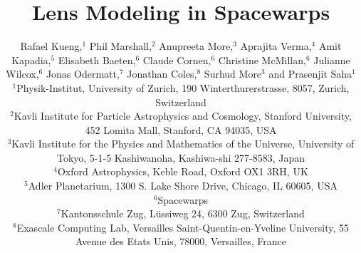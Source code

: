 \documentclass[usenatbib]{mn2e}
\newcommand{\sw}{Spacewarps\xspace}
\begin{document}
\title{Lens Modeling in \sw}

\author[Kueng et al]{Rafael Kueng,$^{1}$
Phil Marshall,$^{2}$
Anupreeta More,$^{3}$
Aprajita Verma,$^{4}$
Amit Kapadia,$^{5}$
\newauthor
Elisabeth Baeten,$^{6}$
Claude Cornen,$^{6}$
Christine McMillan,$^{6}$
Julianne Wilcox,$^{6}$
\newauthor
Jonas Odermatt,$^{7}$
Jonathan Coles,$^{8}$
Surhud More$^{3}$
and Prasenjit Saha$^{1}$ \\
$^{1}$Physik-Institut, University of Zurich, 190 Winterthurerstrasse, 8057, Zurich, Switzerland\\
$^{2}$Kavli Institute for Particle Astrophysics and Cosmology, Stanford University, 452 Lomita Mall, Stanford, CA 94035, USA\\
$^{3}$Kavli Institute for the Physics and Mathematics of the Universe, University of Tokyo, 5-1-5 Kashiwanoha, Kashiwa-shi 277-8583, Japan\\
$^{4}$Oxford Astrophysics, Keble Road, Oxford OX1 3RH, UK\\
$^{5}$Adler Planetarium, 1300 S. Lake Shore Drive, Chicago, IL 60605, USA\\
$^{6}$Spacewarps\\
$^{7}$Kantonsschule Zug, L\"ussiweg 24, 6300 Zug, Switzerland\\
$^{8}$Exascale Computing Lab, Versailles Saint-Quentin-en-Yveline University, 55 Avenue des Etats Unis, 78000, Versailles, France}

\maketitle









\end{document}
